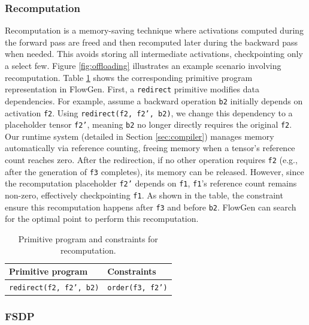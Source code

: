\subsubsection{Recomputation}
\label{sec:recompute}

Recomputation is a memory-saving technique where activations computed during the forward pass are freed and then recomputed later during the backward pass when needed. This avoids storing all intermediate activations, checkpointing only a select few. Figure \ref{fig:offloading} illustrates an example scenario involving recomputation. Table \ref{tab:recompute} shows the corresponding primitive program representation in FlowGen. First, a \texttt{redirect} primitive modifies data dependencies. For example, assume a backward operation \texttt{b2} initially depends on activation \texttt{f2}. Using \texttt{redirect(f2, f2', b2)}, we change this dependency to a placeholder tensor \texttt{f2'}, meaning \texttt{b2} no longer directly requires the original \texttt{f2}. Our runtime system (detailed in Section \ref{sec:compiler}) manages memory automatically via reference counting, freeing memory when a tensor's reference count reaches zero. After the redirection, if no other operation requires \texttt{f2} (e.g., after the generation of \texttt{f3} completes), its memory can be released. However, since the recomputation placeholder \texttt{f2'} depends on \texttt{f1}, \texttt{f1}'s reference count remains non-zero, effectively checkpointing \texttt{f1}. As shown in the table, the constraint ensure this recomputation happens after \texttt{f3} and before \texttt{b2}. FlowGen can search for the optimal point to perform this recomputation.

\begin{table}[h]
  \centering
  \footnotesize
  \begin{tabular}{l|l}
  \textbf{Primitive program} & \textbf{Constraints} \\
  \hline
  \texttt{redirect(f2, f2', b2)} & \texttt{order(f3, f2')} \\
  \hline
  \end{tabular}
  \caption{Primitive program and constraints for recomputation.}
  \label{tab:recompute}
\end{table}

\subsubsection{FSDP}


